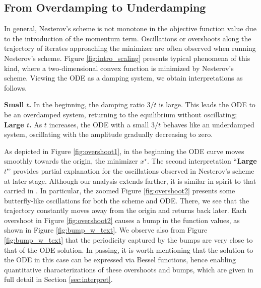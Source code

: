 \documentclass[twoside,11pt]{article}
\begin{document}
\subsection{From Overdamping to Underdamping}
\label{sec:from-overd-underd}
In general, Nesterov's scheme is not monotone in the objective function value due to the introduction of the momentum term. Oscillations or overshoots along the trajectory of iterates approaching the minimizer are often observed when running Nesterov's scheme. Figure \ref{fig:intro_scaling} presents typical phenomena of this kind, where a two-dimensional convex function is minimized by Nesterov's scheme. Viewing the ODE as a damping system, we obtain interpretations as follows.
\par
{\noindent \bf Small $t$.} In the beginning, the damping ratio $3/t$ is large. This leads the ODE to be an overdamped system, returning to the equilibrium without oscillating;\\
{\noindent \bf Large $t$.} As $t$ increases, the ODE with a small $3/t$ behaves like an underdamped system, oscillating with the amplitude gradually decreasing to zero.
\par
As depicted in Figure \ref{fig:overshoot1}, in the beginning the ODE
curve moves smoothly towards the origin, the minimizer $x^\star$. The
second interpretation ``{\bf Large $t$'}' provides partial explanation for the oscillations
observed in Nesterov's scheme at later stage. Although our analysis
extends farther, it is similar in spirit to that carried in
\citet{restart}. In particular, the zoomed Figure \ref{fig:overshoot2}
presents some butterfly-like oscillations for both the scheme and
ODE. There, we see that the trajectory constantly moves away from the origin and returns back later. Each overshoot in Figure \ref{fig:overshoot2} causes a bump in the function values, as shown in Figure \ref{fig:bump_w_text}. We observe also
from Figure \ref{fig:bump_w_text} that the periodicity captured by the
bumps are very close to that of the ODE solution. In passing, it is
worth mentioning that the solution to the ODE in this case can be
expressed via Bessel functions, hence enabling quantitative
characterizations of these overshoots and bumps, which are given in
full detail in Section \ref{sec:interpret}.
\end{document}
